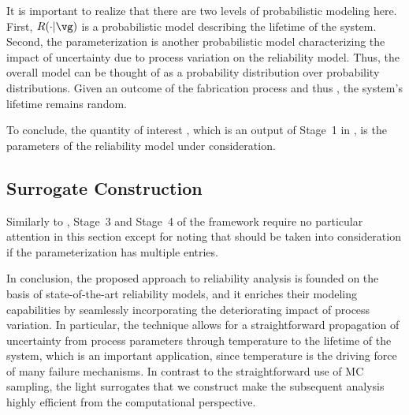 \begin{remark} 
It is important to realize that there are two levels of probabilistic modeling
here. First, $R(\cdot | \vg)$ \perse is a probabilistic model describing the
lifetime \life of the system. Second, the parameterization \vg is another
probabilistic model characterizing the impact of uncertainty due to process
variation on the reliability model. Thus, the overall model can be thought of as
a probability distribution over probability distributions. Given an outcome of
the fabrication process and thus \vg, the system's lifetime remains random.
\end{remark}

To conclude, the quantity of interest \g, which is an output of Stage~1 in
, is the parameters \vg of the reliability model under
consideration.

\subsection{Surrogate Construction}

Similarly to , Stage~3 and Stage~4 of the
framework require no particular attention in this section except for noting that
 should be taken into consideration if the
parameterization \vg has multiple entries.

\conclusioncut
In conclusion, the proposed approach to reliability analysis is founded on the
basis of state-of-the-art reliability models, and it enriches their modeling
capabilities by seamlessly incorporating the deteriorating impact of process
variation. In particular, the technique allows for a straightforward propagation
of uncertainty from process parameters through temperature to the lifetime of
the system, which is an important application, since temperature is the driving
force of many failure mechanisms. In contrast to the straightforward use of
\ac{MC} sampling, the light surrogates that we construct make the subsequent
analysis highly efficient from the computational perspective.

